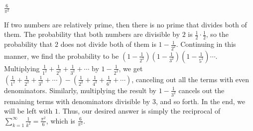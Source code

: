 \documentclass[11pt]{article}
\begin{document}
\begin{answer}
$\boxed{\frac{6}{\pi^2}}$
\end{answer}

\begin{solution}
If two numbers are relatively prime, then there is no prime that divides both of them. The probability that both numbers are divisible by $2$ is $\frac{1}{2} \cdot \frac{1}{2}$, so the probability that $2$ does not divide both of them is $1 - \frac{1}{2^2}$. Continuing in this manner, we find the probability to be $\left(1 - \frac{1}{2^2}\right)\left(1 - \frac{1}{3^2}\right)\left(1 - \frac{1}{5^2}\right) \cdots$. Multiplying $\frac{1}{1^2} + \frac{1}{2^2} + \frac{1}{3^2} + \cdots$ by $1 - \frac{1}{2^2}$, we get $(\frac{1}{1^2} + \frac{1}{2^2} + \frac{1}{3^2} + \cdots) - \left(\frac{1}{2^2} + \frac{1}{4^2} + \frac{1}{6^2} + \cdots\right)$, canceling out all the terms with even denominators. Similarly, multiplying the result by $1 - \frac{1}{3^2}$ cancels out the remaining terms with denominators divisible by $3$, and so forth. In the end, we will be left with $1$. Thus, our desired answer is simply the reciprocal of $\sum\limits_{k = 1}^\infty \frac{1}{k^2} = \frac{\pi^2}{6}$, which is $\boxed{\frac{6}{\pi^2}}$.
\end{solution}
\end{document}
